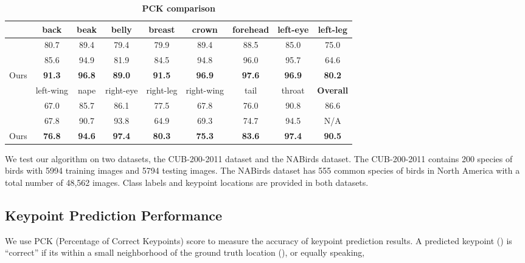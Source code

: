 \begin{table*}[h]
\centering
\caption{\textbf{PCK comparison} }
\label{pck-table}
\begin{tabular}{l | c | c | c | c | c | c | c | c }
\hline
& back & beak & belly & breast & crown & forehead & left-eye & left-leg\\
\hline
\hline
\cite{HuangXTZ_CVPR2016} & 80.7 & 89.4 & 79.4 & 79.9 & 89.4 & 88.5 & 85.0 & 75.0 \\
\hline
\cite{ZhangSGD_ICLRWorkshop2016} & 85.6 & 94.9 &81.9 & 84.5 & 94.8 & 96.0 & 95.7 & 64.6 \\
\hline
Ours  & \bf{91.3} & \bf{96.8} & \bf{89.0} & \bf{91.5} & \bf{96.9} & \bf{97.6} & \bf{96.9} & \bf{80.2}\\
\hline
& left-wing & nape & right-eye & right-leg & right-wing & tail & throat & \textbf{Overall} \\
\hline
\cite{HuangXTZ_CVPR2016} & 67.0 & 85.7 & 86.1 & 77.5 & 67.8 & 76.0 & 90.8 & 86.6\\
\hline
\cite{ZhangSGD_ICLRWorkshop2016} &  67.8 & 90.7 & 93.8 & 64.9 & 69.3 & 74.7 & 94.5 & N/A\\
\hline
Ours & \bf{76.8} & \bf{94.6} & \bf{97.4} & \bf{80.3} & \bf{75.3} & \bf{83.6} & \bf{97.4} & \bf{90.5}\\
\hline
\hline
\end{tabular}
\end{table*}











We test our algorithm on two datasets, the CUB-200-2011 dataset and the NABirds dataset.
The CUB-200-2011 contains 200 species of birds with 5994 training images and 5794 testing images. 
The NABirds dataset has 555 common species of birds in North America with a total number of 48,562 images.
Class labels and keypoint locations are provided in both datasets.



\subsection{Keypoint Prediction Performance}

We use PCK (Percentage of Correct Keypoints) score to measure the accuracy of keypoint prediction results.
A predicted keypoint () is ``correct'' if its within a small neighborhood of the ground truth location (), or equally speaking,  
 
